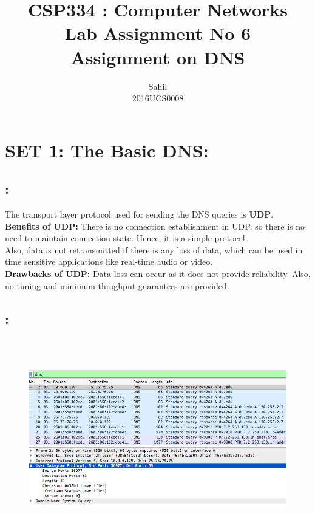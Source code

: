 \documentclass[]{report}
\title{\centering CSP334 : Computer Networks \\Lab Assignment No 6\\Assignment on DNS}
\author{\LARGE Sahil\\2016UCS0008}
\begin{document}
 

\maketitle

\section{SET 1: The Basic DNS:}

\subsection{:}
\large
The transport layer protocol used for sending the DNS queries is \textbf{UDP}.
\\
\textbf{Benefits of UDP:} There is no connection establishment in UDP, so there is no need to maintain connection state. Hence, it is a simple protocol. 
\\
Also, data is not retransmitted if there is any loss of data, which can be used in time sensitive applications like real-time audio or video. 
\\
\textbf{Drawbacks of UDP:} Data loss can occur as it does not provide reliability. Also, no timing and minimum throghput guarantees are provided.

\subsection{:}
\begin{figure}[H]
	\vspace{0pt}
	\includegraphics[height = 250pt, keepaspectratio]{Snapshots/q1/1_2.png}
\end{figure}
\end{document}
